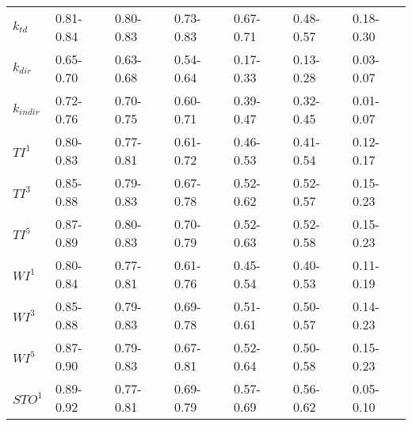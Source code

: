 \begin{table}[ht]
\begin{tabular}{lllllll}
\(\displaystyle k_{td} \) &   {\color[HTML]{EF2A00} 0.81-0.84} & {\color[HTML]{00D768} 0.80-0.83} & {\color[HTML]{0051D7} 0.73-0.83} & {\color[HTML]{6200D7} 0.67-0.71} & {\color{orange} 0.48-0.57} & {\color[HTML]{9B9B9B} 0.18-0.30} \\ 
\(\displaystyle k_{dir} \) &   {\color[HTML]{00D768} 0.65-0.70} & {\color[HTML]{EF2A00} 0.63-0.68} & {\color[HTML]{0051D7} 0.54-0.64} & {\color{orange} 0.17-0.33} & {\color[HTML]{6200D7} 0.13-0.28} & {\color[HTML]{9B9B9B} 0.03-0.07} \\ 
\(\displaystyle k_{indir} \) &   {\color[HTML]{EF2A00} 0.72-0.76} & {\color[HTML]{00D768} 0.70-0.75} & {\color[HTML]{0051D7} 0.60-0.71} & {\color[HTML]{6200D7} 0.39-0.47} & {\color{orange} 0.32-0.45} & {\color[HTML]{9B9B9B} 0.01-0.07} \\ 
\(\displaystyle TI^1 \) &   {\color[HTML]{EF2A00} 0.80-0.83} & {\color[HTML]{00D768} 0.77-0.81} & {\color[HTML]{0051D7} 0.61-0.72} & {\color[HTML]{6200D7} 0.46-0.53} & {\color{orange} 0.41-0.54} & {\color[HTML]{9B9B9B} 0.12-0.17} \\ 
\(\displaystyle TI^3 \) &   {\color[HTML]{EF2A00} 0.85-0.88} & {\color[HTML]{00D768} 0.79-0.83} & {\color[HTML]{0051D7} 0.67-0.78} & {\color{orange} 0.52-0.62} & {\color[HTML]{6200D7} 0.52-0.57} & {\color[HTML]{9B9B9B} 0.15-0.23} \\ 
\(\displaystyle TI^5 \) &   {\color[HTML]{EF2A00} 0.87-0.89} & {\color[HTML]{00D768} 0.80-0.83} & {\color[HTML]{0051D7} 0.70-0.79} & {\color{orange} 0.52-0.63} & {\color[HTML]{6200D7} 0.52-0.58} & {\color[HTML]{9B9B9B} 0.15-0.23} \\ 
\(\displaystyle WI^1 \) &   {\color[HTML]{EF2A00} 0.80-0.84} & {\color[HTML]{00D768} 0.77-0.81} & {\color[HTML]{0051D7} 0.61-0.76} & {\color[HTML]{6200D7} 0.45-0.54} & {\color{orange} 0.40-0.53} & {\color[HTML]{9B9B9B} 0.11-0.19} \\ 
\(\displaystyle WI^3 \) &   {\color[HTML]{EF2A00} 0.85-0.88} & {\color[HTML]{00D768} 0.79-0.83} & {\color[HTML]{0051D7} 0.69-0.78} & {\color{orange} 0.51-0.61} & {\color[HTML]{6200D7} 0.50-0.57} & {\color[HTML]{9B9B9B} 0.14-0.23} \\ 
\(\displaystyle WI^5 \) &   {\color[HTML]{EF2A00} 0.87-0.90} & {\color[HTML]{00D768} 0.79-0.83} & {\color[HTML]{0051D7} 0.67-0.81} & {\color{orange} 0.52-0.64} & {\color[HTML]{6200D7} 0.50-0.58} & {\color[HTML]{9B9B9B} 0.15-0.23} \\ 
\(\displaystyle STO^1 \) &   {\color[HTML]{00D768} 0.89-0.92} & {\color[HTML]{EF2A00} 0.77-0.81} & {\color[HTML]{0051D7} 0.69-0.79} & {\color{orange} 0.57-0.69} & {\color[HTML]{6200D7} 0.56-0.62} & {\color[HTML]{9B9B9B} 0.05-0.10} \\ 

\end{tabular}
\end{table}
